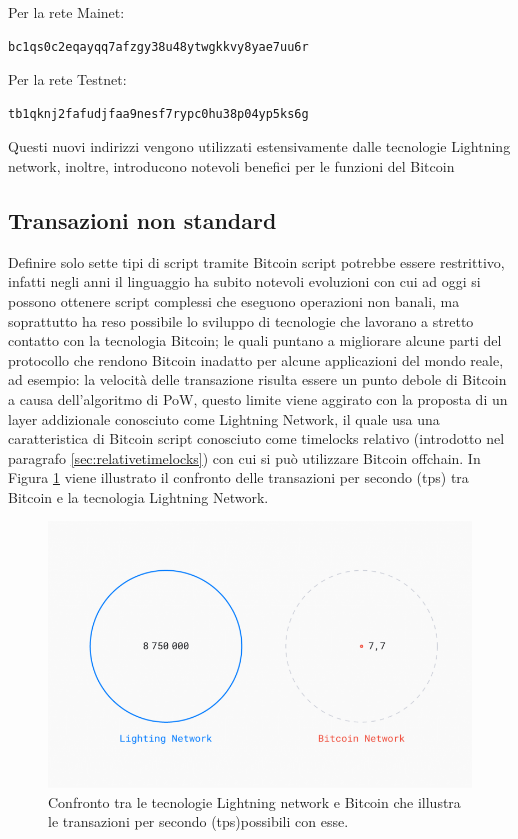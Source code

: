Per la rete Mainet:
\begin{lstlisting}[language=bitcoinscript, label={code:examplep2wsh}, caption={Address base32 della rete mainet.}]
bc1qs0c2eqayqq7afzgy38u48ytwgkkvy8yae7uu6r
\end{lstlisting}
Per la rete Testnet:
\begin{lstlisting}[language=bitcoinscript, label={code:examplep2wsh}, caption={Address base32 della rete testnet.}]
tb1qknj2fafudjfaa9nesf7rypc0hu38p04yp5ks6g
\end{lstlisting}
Questi nuovi indirizzi vengono utilizzati estensivamente dalle tecnologie Lightning network, inoltre, introducono notevoli benefici per le funzioni del Bitcoin

\subsection{Transazioni non standard}
Definire solo sette tipi di script tramite Bitcoin script potrebbe essere restrittivo, infatti negli anni il linguaggio ha subito notevoli evoluzioni con cui ad oggi si possono ottenere script complessi che eseguono operazioni non banali, ma soprattutto ha reso possibile lo sviluppo di tecnologie che lavorano a stretto contatto con la tecnologia Bitcoin; le quali puntano a migliorare alcune parti del protocollo che rendono Bitcoin inadatto per alcune applicazioni del mondo reale, ad esempio: la velocità delle transazione risulta essere un punto debole di Bitcoin a causa dell’algoritmo di PoW, questo limite viene aggirato con la proposta di un layer addizionale conosciuto come Lightning Network, il quale usa una caratteristica di Bitcoin script conosciuto come timelocks relativo (introdotto nel paragrafo \ref{sec:relativetimelocks}) con cui si può utilizzare Bitcoin offchain.
In Figura \ref{fig:velocitytx} viene illustrato il confronto delle transazioni per secondo (tps) tra Bitcoin e la tecnologia Lightning Network.

\begin{figure}[H]
\begin{center}
\includegraphics[width=0.6\columnwidth]{images/Lightning-Network-study.png}
\end{center}
\caption{Confronto tra le tecnologie Lightning network e Bitcoin che illustra le transazioni per secondo (tps)possibili con esse. \cite{satalight:lightningstudy}}
\label{fig:velocitytx}
\end{figure}

